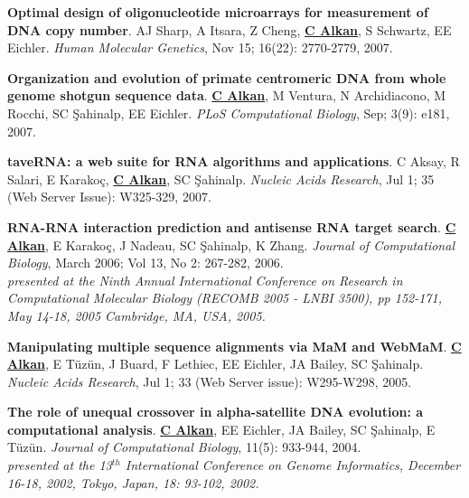 \vspace{-.2cm}
 {\bf Optimal design of oligonucleotide microarrays for measurement of DNA copy number}.
 AJ Sharp, A Itsara, Z Cheng, {\bf {\underline{C Alkan}}}, S Schwartz, EE Eichler.
 {\em Human Molecular Genetics}, Nov 15; 16(22): 2770-2779, 2007.


\vspace{-.2cm}
 {\bf Organization and evolution of primate centromeric DNA from whole genome shotgun sequence data}.
 {\bf {\underline{C Alkan}}}, M Ventura, N Archidiacono, M Rocchi, SC \c{S}ahinalp, EE Eichler.
 {\em PLoS Computational Biology}, Sep; 3(9): e181, 2007.


\vspace{-.2cm}
 {\bf taveRNA: a web suite for RNA algorithms and applications}.
  C Aksay, R Salari, E Karako\c{c}, {\bf {\underline{C Alkan}}}, SC \c{S}ahinalp.
  {\em Nucleic Acids Research}, Jul 1; 35 (Web Server Issue): W325-329, 2007.

\vspace{-.2cm}
 {\bf RNA-RNA interaction prediction and antisense RNA target search}.
  {\bf {\underline{C Alkan}}}, E Karako\c{c}, J Nadeau, SC \c{S}ahinalp,
  K Zhang.
  {\em Journal of Computational Biology}, March 2006; Vol 13, No 2: 267-282, 2006. \\
\hspace*{1cm} {\footnotesize {\it presented at the Ninth Annual International Conference on Research in Computational Molecular Biology
    (RECOMB 2005 - LNBI 3500), pp 152-171, 
    May 14-18, 2005 Cambridge, MA, USA, 2005.}}


\vspace{-.2cm}
{\bf Manipulating multiple sequence alignments via MaM and  WebMaM}.
{\bf {\underline{C Alkan}}}, E T\"{u}z\"{u}n, J Buard, F Lethiec,
EE Eichler, JA Bailey, SC \c{S}ahinalp.
{\em Nucleic Acids Research}, Jul 1; 33 (Web Server issue):
W295-W298, 2005.

\vspace{-.2cm}
 {\bf The role of unequal crossover in alpha-satellite 
   DNA evolution: a computational analysis}.
  {\bf {\underline{C Alkan}}}, EE Eichler, JA Bailey, SC \c{S}ahinalp, E T\"{u}z\"{u}n.
  {\em Journal of Computational Biology}, 11(5): 933-944, 2004. \\
\hspace*{1cm}  {\footnotesize {\it presented at the 13$^{th}$ International Conference on Genome Informatics, 
December 16-18, 2002, Tokyo, Japan, 18: 93-102, 2002.}}

